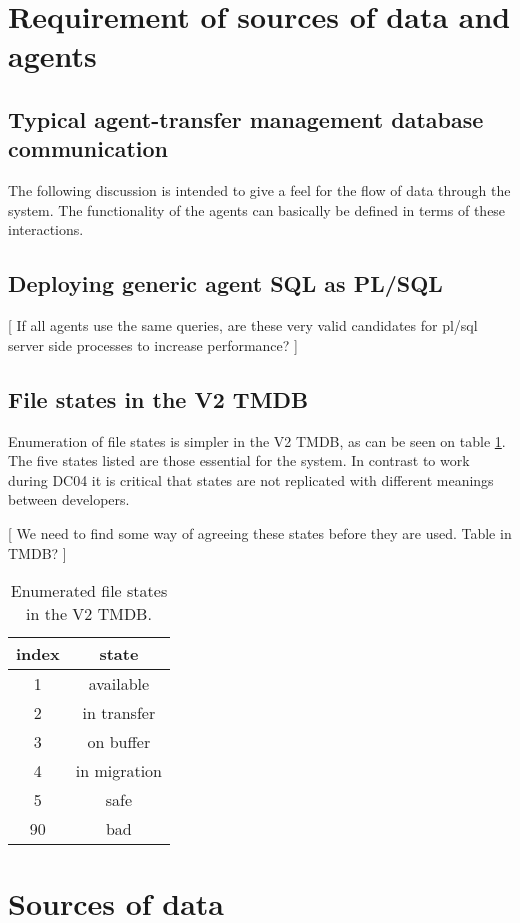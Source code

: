 \documentclass{cmspaper}
\begin{document}
\section{Requirement of sources of data and agents}
\subsection{Typical agent-transfer management database communication}
The following discussion is intended to give a feel for the flow
of data through the system. The functionality of the agents can basically be defined in terms of these interactions.

\subsection{Deploying generic agent SQL as PL/SQL}
[ If all agents use the same queries, are these very valid candidates for pl/sql server side processes to increase performance? ]

\subsection{File states in the V2 TMDB}
Enumeration of file states is simpler in the V2 TMDB, as can be seen on table \ref{table:states}. The five states listed are those essential for the system. In contrast to work during DC04 it is critical that states are not replicated with different meanings between developers. 

[ We need to find some way of agreeing these states before they are used. Table in TMDB? ]

\begin{table}
\centering
\begin{tabular}[!h]{|c|c|} 
\hline index & state
\\ \hline
	1	& 	available
\\ 	2	&	in transfer
\\	3	&	on buffer
\\	4	&	in migration
\\	5	&	safe
\\	90	&	bad
\\ \hline
\end{tabular}
\caption{Enumerated file states in the V2 TMDB.}
\label{table:states}
\end{table}

\section{Sources of data}
\end{document}
